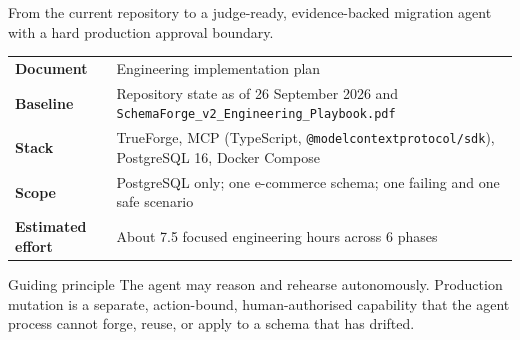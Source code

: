 \documentclass[11pt,a4paper]{article}
\newcommand{\fp}[1]{\nolinkurl{#1}}  %
\begin{document}
\begin{titlepage}

\vspace*{8.6cm}

{\sffamily\large\color{sfnavy}
From the current repository to a judge-ready, evidence-backed migration agent with a
hard production approval boundary.}

\vspace{1.2cm}

\begin{tabularx}{\textwidth}{@{}L{4.2cm}Y@{}}
\toprule
\sffamily\bfseries Document & Engineering implementation plan \\
\sffamily\bfseries Baseline & Repository state as of 26 September 2026 and \fp{SchemaForge_v2_Engineering_Playbook.pdf} \\
\sffamily\bfseries Stack & TrueForge, MCP (TypeScript, \fp{@modelcontextprotocol/sdk}), PostgreSQL 16, Docker Compose \\
\sffamily\bfseries Scope & PostgreSQL only; one e-commerce schema; one failing and one safe scenario \\
\sffamily\bfseries Estimated effort & About 7.5 focused engineering hours across 6 phases \\
\bottomrule
\end{tabularx}

\vfill
\begin{keybox}{Guiding principle}
The agent may reason and rehearse autonomously. Production mutation is a separate,
action-bound, human-authorised capability that the agent process cannot forge,
reuse, or apply to a schema that has drifted.
\end{keybox}
\end{titlepage}
\end{document}
